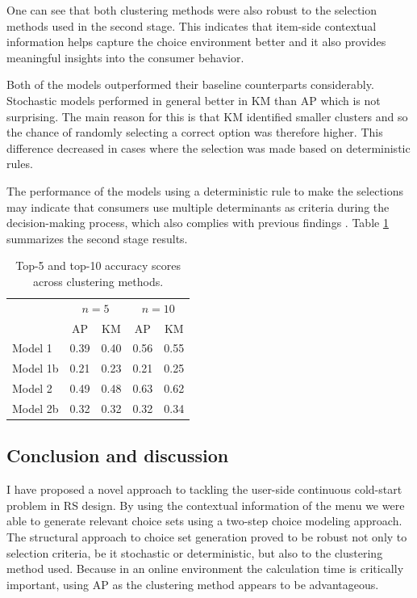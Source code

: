 \documentclass[a4paper,12pt]{article}
\begin{document}
One can see that both clustering methods were also robust to the selection methods used in the second  stage. This indicates that item-side contextual information helps capture the choice environment better and it also provides meaningful insights into the consumer behavior.
 
Both of the models outperformed their baseline counterparts considerably. Stochastic models performed in general better in KM than AP which is not surprising. The main reason for this is that KM identified smaller clusters and so the chance of randomly selecting a correct option was therefore higher. This difference decreased in cases where the selection was made based on deterministic rules.

The performance of the models using a deterministic rule to make the selections may indicate that consumers use multiple determinants as criteria during the decision-making process, which also complies with previous findings \citep{bettman1979memory, lee2004effect}. Table \ref{tab:mainResultsTwoStageModeling} summarizes the second stage results.

\begin{table}
    \centering
    \begin{tabular}{lcccc}\hline
     & \multicolumn{2}{c}{$n=5$} & \multicolumn{2}{c}{$n=10$}\\
     & AP & KM & AP & KM\\\hline
    Model 1\hspace{20mm} & 0.39 & 0.40 & 0.56 & 0.55\\
    Model 1b & 0.21 & 0.23 & 0.21 & 0.25\\
    Model 2 & 0.49 & 0.48 & 0.63 & 0.62\\
    Model 2b & 0.32 & 0.32 & 0.32 & 0.34\\\hline
    \end{tabular}
    \caption{Top-5 and top-10 accuracy scores across clustering methods.}
    \label{tab:mainResultsTwoStageModeling}
\end{table}

\subsection{Conclusion and discussion}

I have proposed a novel approach to tackling the user-side continuous cold-start problem in RS design. By using the contextual information of the menu we were able to generate relevant choice sets using a two-step choice modeling approach. The structural 
approach to choice set generation proved to be robust not only to selection criteria, be it stochastic or deterministic, but also to the clustering method used. Because in an online environment the calculation time is critically important, using AP as the clustering method appears to be advantageous.
\end{document}
